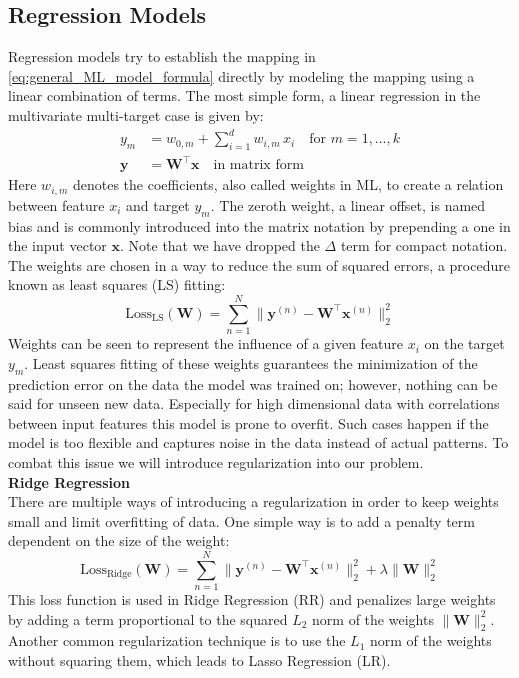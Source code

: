 \subsection{Regression Models}
\label{subsec:background_ml_model_types}
Regression models try to establish the mapping in \autoref{eq:general_ML_model_formula} directly by modeling the mapping using a linear combination of terms. The most simple form, a linear regression in the multivariate multi-target case is given by: 
\begin{equation}
    \label{eq:linear_regression_formula}
    \begin{aligned}
        y_m &= w_{0, m} + \sum_{i=1}^d w_{i,m} \, x_i \quad \text{for } m = 1, \dots, k\\
        \mathbf{y} &= \mathbf{W^\top} \mathbf{x} \quad \text{in matrix form}
    \end{aligned}
\end{equation}
Here $w_{i,m}$ denotes the coefficients, also called weights in ML, to create a relation between feature $x_i$ and target $y_m$. The zeroth weight, a linear offset, is named bias and is commonly introduced into the matrix notation by prepending a one in the input vector $\mathbf{x}$. Note that we have dropped the $\Delta$ term for compact notation. The weights are chosen in a way to reduce the sum of squared errors, a procedure known as least squares (LS) fitting: 
\begin{equation}
    \label{eq:least_squares_error}
    \text{Loss}_\text{LS}(\mathbf{W}) = \sum_{n=1}^{N}\|\mathbf{y}^{(n)} - \mathbf{W^\top} \mathbf{x}^{(n)}\|_2^2
\end{equation}
Weights can be seen to represent the influence of a given feature $x_i$ on the target $y_m$. Least squares fitting of these weights guarantees the minimization of the prediction error on the data the model was trained on; however, nothing can be said for unseen new data. Especially for high dimensional data with correlations between input features this model is prone to overfit. Such cases happen if the model is too flexible and captures noise in the data instead of actual patterns. To combat this issue we will introduce regularization into our problem.\\

\textbf{Ridge Regression}\\
There are multiple ways of introducing a regularization in order to keep weights small and limit overfitting of data. One simple way is to add a penalty term dependent on the size of the weight: 
\begin{equation}
    \label{eq:regularized_least_squares_error}
    \text{Loss}_\text{Ridge}(\mathbf{W}) = \sum_{n=1}^{N}\|\mathbf{y}^{(n)} - \mathbf{W^\top} \mathbf{x}^{(n)}\|_2^2 + \lambda \|\mathbf{W}\|_2^2
\end{equation}
This loss function is used in Ridge Regression (RR) and penalizes large weights by adding a term proportional to the squared $L_2$ norm of the weights $\|\mathbf{W}\|_2^2$. Another common regularization technique is to use the $L_1$ norm of the weights without squaring them, which leads to Lasso Regression (LR). 

